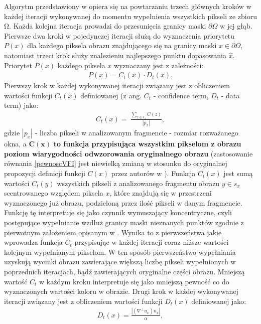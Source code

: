 \documentclass[12pt, twoside, openany]{report}
\theoremstyle{definition}
\begin{document}
Algorytm przedstawiony w \cite{criminisi2004region} opiera się na powtarzaniu trzech głównych kroków w każdej iteracji wykonywanej do momentu wypełnienia wszystkich pikseli ze zbioru $\mathrm{\Omega }$.
Każda kolejna iteracja prowadzi do przesunięcia granicy maski $\partial \Omega$ w jej głąb. Pierwsze dwa kroki w pojedynczej iteracji służą do wyznaczenia priorytetu $P\left(x\right)$ dla każdego piksela obrazu znajdującego się na granicy maski $x \in \partial \Omega$, natomiast trzeci krok służy znalezieniu najlepszego punktu dopasowania $\hat{x}$.
Priorytet $P \left( x \right)$ każdego piksela $x$ wyznaczany jest z zależności:
\begin{align}
P\left( x \right)=C_t(x)\cdot D_t(x).
\label{PRIORITY}
\end{align}
Pierwszy krok w każdej wykonywanej iteracji związany jest z obliczeniem wartości funkcji $C_t(x)$ definiowanej (z ang. $C_t$ - confidence term, $D_t$ - data term) jako:
\begin{align}
C_t\left( x \right)=\ \frac{\sum_{z \in s_x} {C(z)}}{\left|p_x\right|},
\label{confidenceTerm}
\end{align}
gdzie $\left| p_x\right |$ - liczba pikseli w analizowanym fragmencie - rozmiar rozważanego okna,
a $\mathbf{C(x)}$ \textbf{to funkcja przypisująca wszystkim pikselom z obrazu poziom wiarygodności odwzorowania oryginalnego obrazu}
(zastosowanie równania \eqref{pewnoscVFI} jest niewielką zmianą w stosunku do oryginalnej propozycji definicji funkcji $C(x)$ przez autorów w \cite{criminisi2004region}). Funkcja $C_t(x)$ jest sumą wartości $C_t(y)$ wszystkich pikseli z analizowanego fragmentu obrazu $y \in s_x$ scentrowanego względem piksela $x$, które znajdują się w przestrzeni wyznaczonego już obrazu, podzieloną przez ilość pikseli w danym fragmencie. Funkcję tę interpretuje się jako czynnik wymuszający koncentryczne, czyli postępujące wypełnianie wzdłuż granicy maski nieznanych punktów zgodnie z pierwotnym założeniem opisanym w \cite{efros1999texture}. Wynika to z pierwszeństwa jakie wprowadza funkcja $C_t$ przypisując w każdej iteracji coraz niższe wartości kolejnym wypełnianym pikselom. W ten sposób pierwszeństwo wypełniania uzyskują wycinki obrazu zawierające większą liczbę pikseli wypełnionych w poprzednich iteracjach, bądź zawierających oryginalne części obrazu. Mniejszą wartość $C_t$ w każdym kroku interpretuje się jako mniejszą pewność co do wyznaczonych wartości koloru w obrazie.
Drugi krok w każdej wykonywanej iteracji związany jest z obliczeniem wartości funkcji $D_t(x)$ definiowanej jako:
\begin{align}
D_t(x)= \frac{\left|\left( \nabla^{\bot}u_x \right) n_x\right|}{\alpha },
\label{DataTerm}
\end{align}
\end{document}
